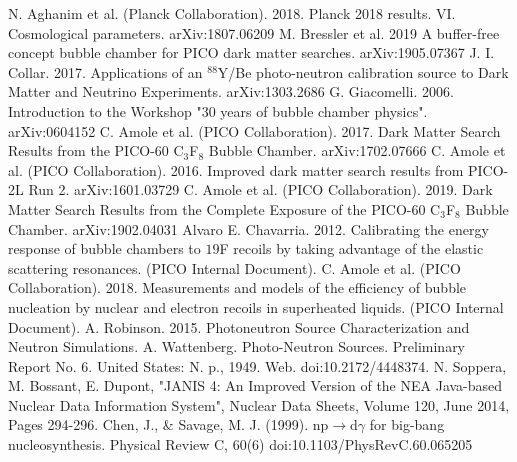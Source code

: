 \documentclass[%
12pt,
twoside,
reprint,
amsmath,amssymb,
aps,
]{article}
\begin{document}
	\pagebreak
	\begin{thebibliography}{1}
		\footnotesize
		 N. Aghanim et al. (Planck Collaboration). 2018. Planck 2018 results. VI. Cosmological parameters. arXiv:1807.06209
		 M. Bressler et al. 2019 A buffer-free concept bubble chamber for PICO dark matter searches. arXiv:1905.07367
		 J. I. Collar. 2017. Applications of an $^{88}$Y/Be photo-neutron calibration source
		to Dark Matter and Neutrino Experiments. arXiv:1303.2686
		 G. Giacomelli. 2006. Introduction to the Workshop "30 years of bubble chamber physics". arXiv:0604152
		 C. Amole et al. (PICO Collaboration). 2017. Dark Matter Search Results from the PICO-60 C$_{3}$F$_{8}$ Bubble Chamber. arXiv:1702.07666 
		 C. Amole et al. (PICO Collaboration). 2016. Improved dark matter search results from PICO-2L Run 2. arXiv:1601.03729
		 C. Amole et al. (PICO Collaboration). 2019. Dark Matter Search Results from the  Complete Exposure of the PICO-60 C$_{3}$F$_{8}$ Bubble Chamber. arXiv:1902.04031 
		 Alvaro E. Chavarria. 2012. Calibrating the energy response of bubble chambers to ${19}$F recoils by taking advantage of the elastic scattering resonances. (PICO Internal Document).
		 C. Amole et al. (PICO Collaboration). 2018. Measurements and models of the efficiency of bubble nucleation by nuclear and electron recoils in superheated liquids. (PICO Internal Document).
		 A. Robinson. 2015. Photoneutron Source Characterization and Neutron Simulations.
		 A. Wattenberg. Photo-Neutron Sources. Preliminary Report No. 6. United States: N. p., 1949. Web. doi:10.2172/4448374.
		 N. Soppera, M. Bossant, E. Dupont, "JANIS 4: An Improved Version of the NEA Java-based Nuclear Data Information System", Nuclear Data Sheets, Volume 120, June 2014, Pages 294-296.
		 Chen, J., \& Savage, M. J. (1999). np$\rightarrow$d$\gamma$ for big-bang nucleosynthesis. Physical Review C, 60(6) doi:10.1103/PhysRevC.60.065205
		
	\end{thebibliography}
	\normalsize
\end{document}

